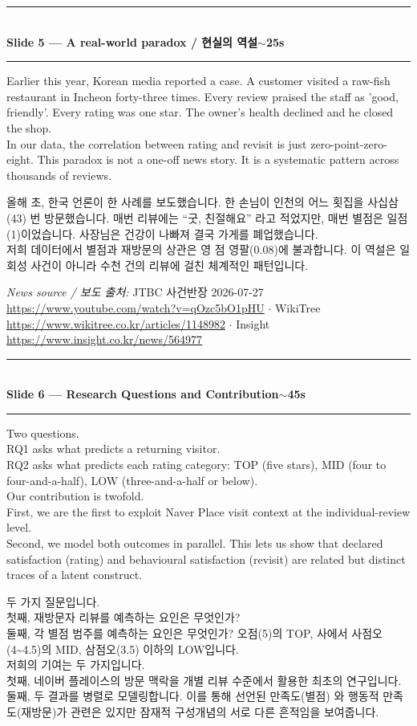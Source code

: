 \documentclass[10pt,a4paper]{article}
\newcommand{\sechead}[2]{%
  \vspace{6pt}%
  \noindent\rule{\linewidth}{0.6pt}\\[1pt]
  {\small\bfseries #1\hfill #2}\\[-3pt]
  \rule{\linewidth}{0.4pt}\par\vspace{2pt}%
}
\newcommand{\sent}[1]{#1\\[4pt]}
\newcommand{\bilingual}[2]{%
  \noindent%
  \begin{minipage}[t]{0.485\linewidth}
    \small #1
  \end{minipage}\hfill\vrule\hfill%
  \begin{minipage}[t]{0.483\linewidth}
    \small #2
  \end{minipage}\par\vspace{3pt}%
}
\begin{document}
\sechead{Slide 5 --- A real-world paradox / 현실의 역설}{$\sim$25s}

\bilingual{%
\sent{Earlier this year, Korean media reported a case. A customer visited
a raw-fish restaurant in Incheon forty-three times. Every review praised
the staff as 'good, friendly'. Every rating was one star. The owner's
health declined and he closed the shop.}
\sent{In our data, the correlation between rating and revisit is just
zero-point-zero-eight. This paradox is not a one-off news story. It is
a systematic pattern across thousands of reviews.}
}{%
\sent{올해 초, 한국 언론이 한 사례를 보도했습니다. 한 손님이 인천의
어느 횟집을 사십삼(43) 번 방문했습니다. 매번 리뷰에는 ``굿, 친절해요''
라고 적었지만, 매번 별점은 일점(1)이었습니다. 사장님은 건강이 나빠져
결국 가게를 폐업했습니다.}
\sent{저희 데이터에서 별점과 재방문의 상관은 영 점 영팔(0.08)에
불과합니다. 이 역설은 일회성 사건이 아니라 수천 건의 리뷰에 걸친
체계적인 패턴입니다.}
}

\vspace{2pt}
{\scriptsize\textit{News source / 보도 출처:}
JTBC 사건반장 2026-07-27 \url{https://www.youtube.com/watch?v=qOzc5bO1pHU}
$\cdot$ WikiTree \url{https://www.wikitree.co.kr/articles/1148982}
$\cdot$ Insight \url{https://www.insight.co.kr/news/564977}}
\vspace{3pt}

\sechead{Slide 6 --- Research Questions and Contribution}{$\sim$45s}

\bilingual{%
\sent{Two questions.}
\sent{RQ1 asks what predicts a returning visitor.}
\sent{RQ2 asks what predicts each rating category: TOP (five stars),
MID (four to four-and-a-half), LOW (three-and-a-half or below).}
\sent{Our contribution is twofold.}
\sent{First, we are the first to exploit Naver Place visit context at
the individual-review level.}
\sent{Second, we model both outcomes in parallel. This lets us show that
declared satisfaction (rating) and behavioural satisfaction (revisit)
are related but distinct traces of a latent construct.}
}{%
\sent{두 가지 질문입니다.}
\sent{첫째, 재방문자 리뷰를 예측하는 요인은 무엇인가?}
\sent{둘째, 각 별점 범주를 예측하는 요인은 무엇인가? 오점(5)의 TOP,
사에서 사점오(4\textasciitilde4.5)의 MID, 삼점오(3.5) 이하의 LOW입니다.}
\sent{저희의 기여는 두 가지입니다.}
\sent{첫째, 네이버 플레이스의 방문 맥락을 개별 리뷰 수준에서 활용한
최초의 연구입니다.}
\sent{둘째, 두 결과를 병렬로 모델링합니다. 이를 통해 선언된 만족도(별점)
와 행동적 만족도(재방문)가 관련은 있지만 잠재적 구성개념의 서로 다른
흔적임을 보여줍니다.}
}
\end{document}
